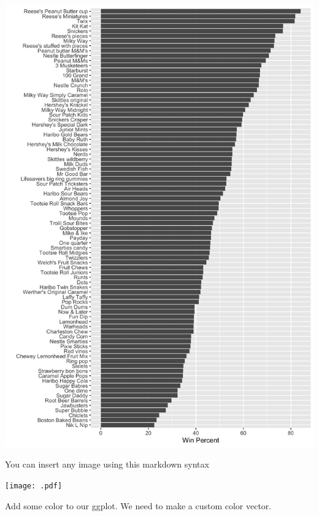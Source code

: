 \documentclass[
  letterpaper,
  DIV=11,
  numbers=noendperiod]{scrartcl}
\newenvironment{Shaded}{\begin{snugshade}}{\end{snugshade}}
\newcommand{\CommentTok}[1]{\textcolor[rgb]{0.37,0.37,0.37}{#1}}
\newcommand{\FunctionTok}[1]{\textcolor[rgb]{0.28,0.35,0.67}{#1}}
\newcommand{\NormalTok}[1]{\textcolor[rgb]{0.00,0.23,0.31}{#1}}
\newcommand{\OtherTok}[1]{\textcolor[rgb]{0.00,0.23,0.31}{#1}}
\newcommand{\SpecialCharTok}[1]{\textcolor[rgb]{0.37,0.37,0.37}{#1}}
\newcommand{\StringTok}[1]{\textcolor[rgb]{0.13,0.47,0.30}{#1}}
\begin{document}
\includegraphics{barplot1.png}

You can insert any image using this markdown syntax

\texttt{[image: .pdf]}

Add some color to our ggplot. We need to make a custom color vector.

\begin{Shaded}
\end{Shaded}
\end{document}
